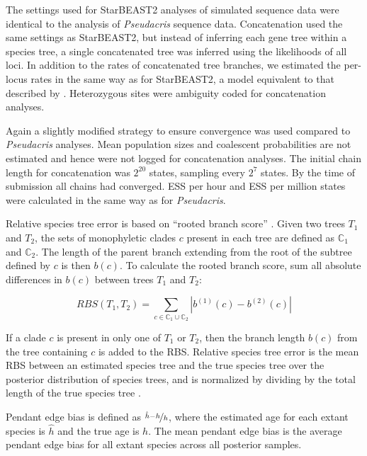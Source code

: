 \documentclass[12pt]{article}
\begin{document}
The settings used for StarBEAST2 analyses of simulated sequence data were
identical to the analysis of \textit{Pseudacris} sequence data. Concatenation
used the same settings as StarBEAST2, but instead of inferring each gene tree
within a species tree, a single concatenated tree was inferred using the
likelihoods of all loci. In addition to the rates of concatenated tree branches,
we estimated the per-locus rates in the same way as for StarBEAST2, a model
equivalent to that described by \cite{Rasmussen01122007}. Heterozygous sites
were ambiguity coded for concatenation analyses.

Again a slightly modified strategy to ensure convergence was used compared to
\textit{Pseudacris} analyses. Mean population sizes and coalescent probabilities
are not estimated and hence were not logged for concatenation analyses. The
initial chain length for concatenation was $2^{20}$ states, sampling every
$2^{7}$ states. By the time of submission all chains had converged. ESS per hour
and ESS per million states were calculated in the same way as for
\textit{Pseudacris}.

Relative species tree error is based on ``rooted branch score''
\citep[RBS;][]{Heled2013}. Given two trees $T_1$ and $T_2$, the sets of
monophyletic clades $c$ present in each tree are defined as $\mathbb{C}_1$ and
$\mathbb{C}_2$. The length of the parent branch extending from the root of the
subtree defined by $c$ is then $b(c)$. To calculate the rooted branch score, sum
all absolute differences in $b(c)$ between trees $T_1$ and $T_2$:

\begin{equation}
RBS(T_1, T_2) = \sum_{c \in {\mathbb{C}_1} \cup {\mathbb{C}_2}} |b^{(1)}(c) - b^{(2)}(c)|
\end{equation}

If a clade $c$ is present in only one of $T_1$ or $T_2$, then the branch length
$b(c)$ from the tree containing $c$ is added to the RBS. Relative species tree
error is the mean RBS between an estimated species tree and the true
species tree over the posterior distribution of species trees, and is normalized
by dividing by the total length of the true species tree
\citep{Ogilvie01052016}.

Pendant edge bias is defined as $\nicefrac{\hat{h} - h}{h}$, where the estimated
age for each extant species is $\hat{h}$ and the true age is $h$. The mean
pendant edge bias is the average pendant edge bias for all extant species across
all posterior samples.
\end{document}

